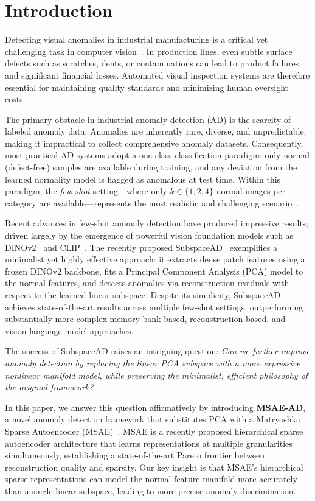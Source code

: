 \section{Introduction}
\label{sec:intro}

Detecting visual anomalies in industrial manufacturing is a critical yet challenging task in computer vision~\cite{Bergmann2019MVTec}.
In production lines, even subtle surface defects such as scratches, dents, or contaminations can lead to product failures and significant financial losses.
Automated visual inspection systems are therefore essential for maintaining quality standards and minimizing human oversight costs.

The primary obstacle in industrial anomaly detection (AD) is the scarcity of labeled anomaly data.
Anomalies are inherently rare, diverse, and unpredictable, making it impractical to collect comprehensive anomaly datasets.
Consequently, most practical AD systems adopt a one-class classification paradigm: only normal (defect-free) samples are available during training, and any deviation from the learned normality model is flagged as anomalous at test time.
Within this paradigm, the \emph{few-shot} setting---where only $k \in \{1, 2, 4\}$ normal images per category are available---represents the most realistic and challenging scenario~\cite{Huang2022WinCLIP,Li2024PromptAD}.

Recent advances in few-shot anomaly detection have produced impressive results, driven largely by the emergence of powerful vision foundation models such as DINOv2~\cite{Oquab2023DINOv2} and CLIP~\cite{Radford2021CLIP}.
The recently proposed SubspaceAD~\cite{Lendering2025SubspaceAD} exemplifies a minimalist yet highly effective approach: it extracts dense patch features using a frozen DINOv2 backbone, fits a Principal Component Analysis (PCA) model to the normal features, and detects anomalies via reconstruction residuals with respect to the learned linear subspace.
Despite its simplicity, SubspaceAD achieves state-of-the-art results across multiple few-shot settings, outperforming substantially more complex memory-bank-based, reconstruction-based, and vision-language model approaches.

The success of SubspaceAD raises an intriguing question: \emph{Can we further improve anomaly detection by replacing the linear PCA subspace with a more expressive nonlinear manifold model, while preserving the minimalist, efficient philosophy of the original framework?}

In this paper, we answer this question affirmatively by introducing \textbf{MSAE-AD}, a novel anomaly detection framework that substitutes PCA with a Matryoshka Sparse Autoencoder (MSAE)~\cite{Zaigrajew2025MSAE}.
MSAE is a recently proposed hierarchical sparse autoencoder architecture that learns representations at multiple granularities simultaneously, establishing a state-of-the-art Pareto frontier between reconstruction quality and sparsity.
Our key insight is that MSAE's hierarchical sparse representations can model the normal feature manifold more accurately than a single linear subspace, leading to more precise anomaly discrimination.

